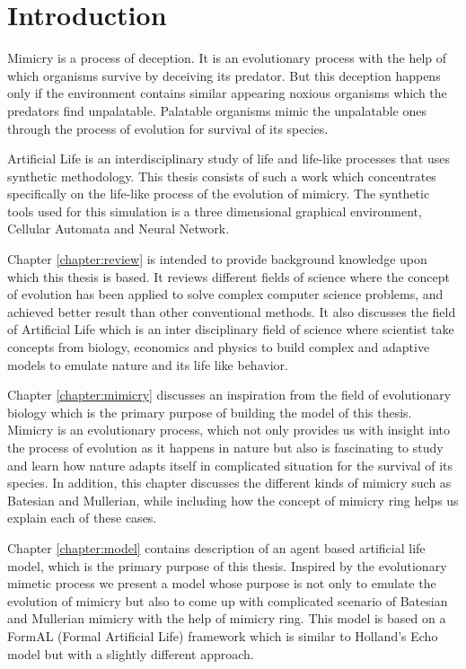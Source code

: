 \chapter{Introduction}
\label{chapter:introduction}

Mimicry is a process of deception. It is an evolutionary process with the help of which organisms survive by deceiving its predator. But this deception happens only if the environment contains similar appearing noxious organisms which the predators find unpalatable. Palatable organisms mimic the unpalatable ones through the process of evolution for survival of its species.

Artificial Life is an interdisciplinary study of life and life-like processes that uses synthetic methodology. This thesis consists of such a work which concentrates specifically on the life-like process of the evolution of mimicry. The synthetic tools used for this simulation is a three dimensional graphical environment, Cellular Automata and Neural Network. 

Chapter \ref{chapter:review} is intended to provide background knowledge upon which this thesis is based. It reviews different fields of science where the concept of evolution has been applied to solve complex computer science problems, and achieved better result than other conventional methods. It also discusses the field of Artificial Life which is an inter disciplinary field of science where scientist take concepts from biology, economics and physics to build complex and adaptive models to emulate nature and its life like behavior.

Chapter \ref{chapter:mimicry} discusses an inspiration from the field of evolutionary biology which is the primary purpose of building the model of this thesis. Mimicry is an evolutionary process, which not only provides us with insight into the process of evolution as it happens in nature but also is fascinating to study and learn how nature adapts itself in complicated situation for the survival of its species. In addition, this chapter discusses the different kinds of mimicry such as Batesian and Mullerian, while including how the concept of mimicry ring helps us explain each of these cases. 

Chapter \ref{chapter:model} contains description of an agent based artificial life model, which is the primary purpose of this thesis. Inspired by the evolutionary mimetic process we present a model whose purpose is not only to emulate the evolution of mimicry but also to come up with complicated scenario of Batesian and Mullerian mimicry with the help of mimicry ring. This model is based on a FormAL (Formal Artificial Life) framework which is similar to Holland's Echo model but with a slightly different approach. 

